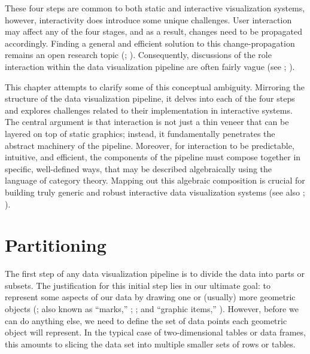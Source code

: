 \documentclass[
  openany]{book}
\theoremstyle{definition}
\theoremstyle{definition}
\theoremstyle{definition}
\theoremstyle{definition}
\theoremstyle{remark}
\begin{document}
These four steps are common to both static and interactive visualization systems, however, interactivity does introduce some unique challenges. User interaction may affect any of the four stages, and as a result, changes need to be propagated accordingly. Finding a general and efficient solution to this change-propagation remains an open research topic (; ). Consequently, discussions of the role interaction within the data visualization pipeline are often fairly vague (see ; ).

This chapter attempts to clarify some of this conceptual ambiguity. Mirroring the structure of the data visualization pipeline, it delves into each of the four steps and explores challenges related to their implementation in interactive systems. The central argument is that interaction is not just a thin veneer that can be layered on top of static graphics; instead, it fundamentally penetrates the abstract machinery of the pipeline. Moreover, for interaction to be predictable, intuitive, and efficient, the components of the pipeline must compose together in specific, well-defined ways, that may be described algebraically using the language of category theory. Mapping out this algebraic composition is crucial for building truly generic and robust interactive data visualization systems (see also ; ).

\section{Partitioning}\label{partitioning}

The first step of any data visualization pipeline is to divide the data into parts or subsets. The justification for this initial step lies in our ultimate goal: to represent some aspects of our data by drawing one or (usually) more geometric objects (; also known as ``marks,'' ; ; and ``graphic items,'' ). However, before we can do anything else, we need to define the set of data points each geometric object will represent. In the typical case of two-dimensional tables or data frames, this amounts to slicing the data set into multiple smaller sets of rows or tables.
\end{document}
